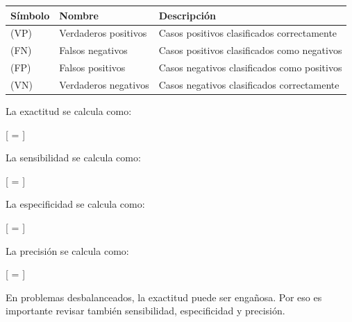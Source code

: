 \documentclass[
  11pt,
  letterpaper,
]{book}
\newcounter{none} %
\begin{document}
{\def\LTcaptype{none} %
\begin{longtable}[]{@{}
  >{\raggedright\arraybackslash}p{}
  >{\raggedright\arraybackslash}p{}
  >{\raggedright\arraybackslash}p{}@{}}
\toprule\noalign{}
\begin{minipage}[b]{\linewidth}\raggedright
Símbolo
\end{minipage} & \begin{minipage}[b]{\linewidth}\raggedright
Nombre
\end{minipage} & \begin{minipage}[b]{\linewidth}\raggedright
Descripción
\end{minipage} \\
\midrule\noalign{}
\endhead
\bottomrule\noalign{}
\endlastfoot
(VP) & Verdaderos positivos & Casos positivos clasificados
correctamente \\
(FN) & Falsos negativos & Casos positivos clasificados como negativos \\
(FP) & Falsos positivos & Casos negativos clasificados como positivos \\
(VN) & Verdaderos negativos & Casos negativos clasificados
correctamente \\
\end{longtable}
}

La exactitud se calcula como:

{[}  =  {]}

La sensibilidad se calcula como:

{[}  =  {]}

La especificidad se calcula como:

{[}  =  {]}

La precisión se calcula como:

{[}  =  {]}

En problemas desbalanceados, la exactitud puede ser engañosa. Por eso es
importante revisar también sensibilidad, especificidad y precisión.
\end{document}
